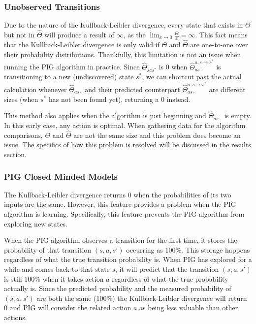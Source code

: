 \documentclass[12pt]{thesis}
\begin{document}
\subsubsection{Unobserved Transitions}
Due to the nature of the Kullback-Leibler divergence, every state that exists in $\Theta$ but not in $\hat{\Theta}$ will produce a result of $\infty$, as the $\lim_{x \rightarrow 0} \frac{\Theta}{x} = \infty$. This fact means that the Kullback-Leibler divergence is only valid if $\Theta$ and $\hat{\Theta}$ are one-to-one over their probability distributions. Thankfully, this limitation is not an issue when running the PIG algorithm in practice. Since $\hat{\Theta}_{sas^{*}}$ is 0 when $\hat{\Theta}_{as\cdot}^{a,s \rightarrow s^{*}}$ is transitioning to a new (undiscovered) state $s^{*}$, we can shortcut past the actual calculation whenever  $\hat{\Theta}_{as\cdot}$ and their predicted counterpart $\hat{\Theta}_{as\cdot}^{a,s \rightarrow s^{*}}$ are different sizes (when $s^{*}$ has not been found yet), returning a 0 instead.

This method also applies when the algorithm is just beginning and $\hat{\Theta}_{as\cdot}$ is empty. In this early case, any action is optimal. When gathering data for the algorithm comparisons, $\Theta$ and $\hat{\Theta}$ are not the same size and this problem does become an issue. The specifics of how this problem is resolved will be discussed in the results section.

\subsubsection{PIG Closed Minded Models}
The Kullback-Leibler divergence returns 0 when the probabilities of its two inputs are the same. However, this feature provides a problem when the PIG algorithm is learning. Specifically, this feature prevents the PIG algorithm from exploring new states.

When the PIG algorithm observes a transition for the first time, it stores the probability of that transition $(s,a,s')$ occurring as 100\%. This storage happens regardless of what the true transition probability is. When PIG has explored for a while and comes back to that state $s$, it will predict that the transition $(s,a,s')$ is still 100\% when it takes action $a$ regardless of what the true probability actually is. Since the predicted probability and the measured probability of $(s,a,s')$ are both the same (100\%) the Kullback-Leibler divergence will return 0 and PIG will consider the related action $a$ as being less valuable than other actions.
\end{document}
